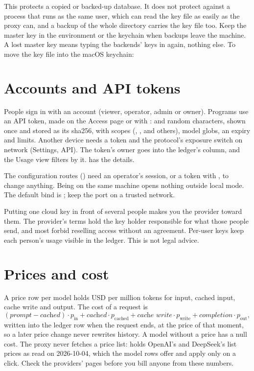 This protects a copied or backed-up database. It does not protect against a process that runs as the same user, which can read the key file as easily as the proxy can, and a backup of the whole directory carries the key file too. Keep the master key in the environment or the keychain when backups leave the machine. A lost master key means typing the backends' keys in again, nothing else. To move the key file into the macOS keychain:


\section{Accounts and API tokens}\label{sec:users}

People sign in with an account (viewer, operator, admin or owner). Programs use an API token, made on the Access page or with :  and random characters, shown once and stored as its sha256, with scopes (, ,  and others), model globs, an expiry and limits. Another device needs a token and the protocol's exposure switch on network (Settings, API). The token's owner goes into the ledger's  column, and the Usage view filters by it.  has the details.

The configuration routes () need an operator's session, or a token with , to change anything. Being on the same machine opens nothing outside local mode. The default bind is ; keep the port on a trusted network.

Putting one cloud key in front of several people makes you the provider toward them. The provider's terms hold the key holder responsible for what those people send, and most forbid reselling access without an agreement. Per-user keys keep each person's usage visible in the ledger. This is not legal advice.

\section{Prices and cost}

A price row per model holds USD per million tokens for input, cached input, cache write and output. The cost of a request is
\[
(\textit{prompt} - \textit{cached})\cdot p_\text{in} + \textit{cached}\cdot p_\text{cached} + \textit{cache write}\cdot p_\text{write} + \textit{completion}\cdot p_\text{out},
\]
written into the ledger row when the request ends, at the price of that moment, so a later price change never rewrites history. A model without a price has a null cost. The proxy never fetches a price list:  holds OpenAI's and DeepSeek's list prices as read on 2026-10-04, which the model rows offer and apply only on a click. Check the providers' pages before you bill anyone from these numbers.


